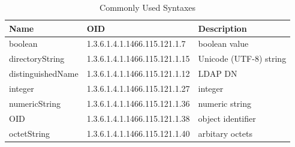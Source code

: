 \documentclass[a4paper]{report}
\begin{document}
\begin{table}[htb!]
	\centering
	\caption{Commonly Used Syntaxes}
	\begin{tabular}{|l|l|l|}
		\hline
		\textbf{Name}     & \textbf{OID}                  & \textbf{Description}   \\ \hline
		boolean           & 1.3.6.1.4.1.1466.115.121.1.7  & boolean value          \\ \hline
		directoryString   & 1.3.6.1.4.1.1466.115.121.1.15 & Unicode (UTF-8) string \\ \hline
		distinguishedName & 1.3.6.1.4.1.1466.115.121.1.12 & LDAP DN                \\ \hline
		integer           & 1.3.6.1.4.1.1466.115.121.1.27 & integer                \\ \hline
		numericString     & 1.3.6.1.4.1.1466.115.121.1.36 & numeric string         \\ \hline
		OID               & 1.3.6.1.4.1.1466.115.121.1.38 & object identifier      \\ \hline
		octetString       & 1.3.6.1.4.1.1466.115.121.1.40 & arbitary octets        \\ \hline
	\end{tabular}
\end{table}
\end{document}
